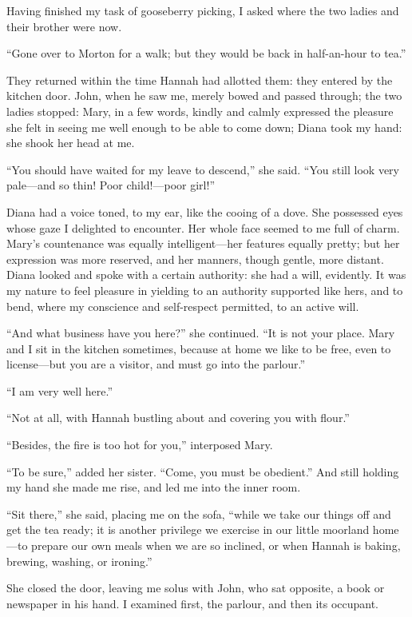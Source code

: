 Having finished my task of gooseberry picking, I asked where the two
ladies and their brother were now.

\enquote{Gone over to Morton for a walk; but they would be back in
half-an-hour to tea.}

They returned within the time Hannah had allotted them: they entered by
the kitchen door. \Mr{} \St{} John, when he saw me, merely bowed and passed
through; the two ladies stopped: Mary, in a few words, kindly and calmly
expressed the pleasure she felt in seeing me well enough to be able to
come down; Diana took my hand: she shook her head at me.

\enquote{You should have waited for my leave to descend,} she said. 
\enquote{You still look very pale---and so thin! Poor child!---poor
girl!}

Diana had a voice toned, to my ear, like the cooing of a dove. She
possessed eyes whose gaze I delighted to encounter. Her whole face
seemed to me full of charm. Mary's countenance was equally
intelligent---her features equally pretty; but her expression was more
reserved, and her manners, though gentle, more distant. Diana looked
and spoke with a certain authority: she had a will, evidently. It was
my nature to feel pleasure in yielding to an authority supported like
hers, and to bend, where my conscience and self-respect permitted, to an
active will.

\enquote{And what business have you here?} she continued. \enquote{It
is not your place. Mary and I sit in the kitchen sometimes, because at
home we like to be free, even to license---but you are a visitor, and
must go into the parlour.}

\enquote{I am very well here.}

\enquote{Not at all, with Hannah bustling about and covering you with
flour.}

\enquote{Besides, the fire is too hot for you,} interposed Mary.

\enquote{To be sure,} added her sister. \enquote{Come, you must be
obedient.} And still holding my hand she made me rise, and led me into
the inner room.

\enquote{Sit there,} she said, placing me on the sofa, \enquote{while we
take our things off and get the tea ready; it is another privilege we
exercise in our little moorland home---to prepare our own meals when we
are so inclined, or when Hannah is baking, brewing, washing, or
ironing.}

She closed the door, leaving me solus with \Mr{} \St{} John, who sat
opposite, a book or newspaper in his hand. I examined first, the
parlour, and then its occupant.

